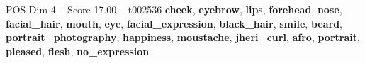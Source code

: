 \begin{textsample}{POS Dim 4 – Score 17.00 – t002536}  \label{ex:f4_pos_037}
\textbf{cheek}, \textbf{eyebrow}, \textbf{lips}, \textbf{forehead}, \textbf{nose}, \textbf{facial\_hair}, \textbf{mouth}, \textbf{eye}, \textbf{facial\_expression}, \textbf{black\_hair}, \textbf{smile}, \textbf{beard}, \textbf{portrait\_photography}, \textbf{happiness}, \textbf{moustache}, \textbf{jheri\_curl}, \textbf{afro}, \textbf{portrait}, \textbf{pleased}, \textbf{flesh}, \textbf{no\_expression}

\end{textsample}
